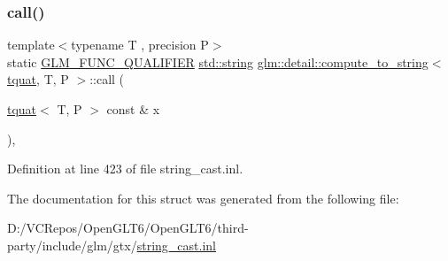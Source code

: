 \subsubsection{\texorpdfstring{call()}{call()}}
{\footnotesize\ttfamily template$<$typename T , precision P$>$ \\
static \mbox{\hyperlink{setup_8hpp_a33fdea6f91c5f834105f7415e2a64407}{G\+L\+M\+\_\+\+F\+U\+N\+C\+\_\+\+Q\+U\+A\+L\+I\+F\+I\+ER}} \mbox{\hyperlink{glad_8h_ac83513893df92266f79a515488701770}{std\+::string}} \mbox{\hyperlink{structglm_1_1detail_1_1compute__to__string}{glm\+::detail\+::compute\+\_\+to\+\_\+string}}$<$ \mbox{\hyperlink{structglm_1_1tquat}{tquat}}, T, P $>$\+::call (\begin{DoxyParamCaption}\item[{\mbox{\hyperlink{structglm_1_1tquat}{tquat}}$<$ T, P $>$ const \&}]{x }\end{DoxyParamCaption})\hspace{0.3cm}{\ttfamily [inline]}, {\ttfamily [static]}}



Definition at line 423 of file string\+\_\+cast.\+inl.



The documentation for this struct was generated from the following file\+:\begin{DoxyCompactItemize}
\item 
D\+:/\+V\+C\+Repos/\+Open\+G\+L\+T6/\+Open\+G\+L\+T6/third-\/party/include/glm/gtx/\mbox{\hyperlink{string__cast_8inl}{string\+\_\+cast.\+inl}}\end{DoxyCompactItemize}
